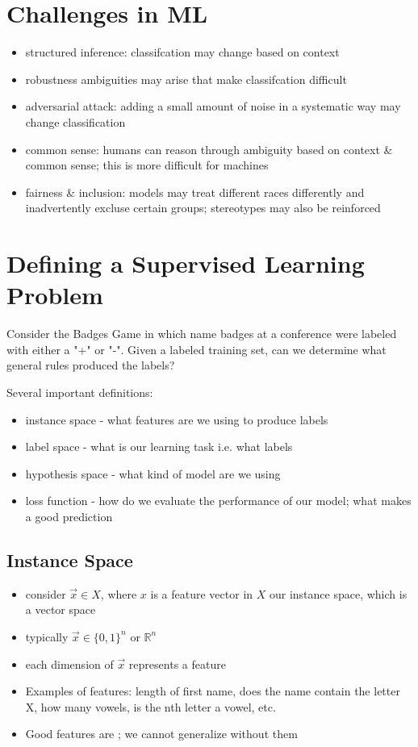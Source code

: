 \section{Challenges in ML}
\begin{itemize}
    \item structured inference: classifcation may change based on context
    \item robustness ambiguities may arise that make classifcation difficult
    \item adversarial attack: adding a small amount of noise in a systematic way may change classification 
    \item common sense: humans can reason through ambiguity based on context \& common sense; this is more difficult for machines
    \item fairness \& inclusion: models may treat different races differently and inadvertently excluse certain groups; stereotypes may also be reinforced
\end{itemize}

\section{Defining a Supervised Learning Problem}

Consider the Badges Game in which name badges at a conference were labeled with either a "+" or "-". Given a labeled training set, can we determine what general rules produced the labels?

Several important definitions:
\begin{itemize}
    \item instance space - what features are we using to produce labels
    \item label space - what is our learning task i.e. what labels
    \item hypothesis space - what kind of model are we using
    \item loss function - how do we evaluate the performance of our model; what makes a good prediction
\end{itemize}

\subsection{Instance Space}
\begin{itemize}
    \item consider $\vec{x} \in X$, where $x$ is a feature vector in $X$ our instance space, which is a vector space
    \item typically $\vec{x} \in \{0,1\}^n$ or $\mathbb{R}^n$
    \item each dimension of $\vec{x}$ represents a feature
    \item Examples of features: length of first name, does the name contain the letter X, how many vowels, is the nth letter a vowel, etc.
    \item Good features are ; we cannot generalize without them
\end{itemize}

